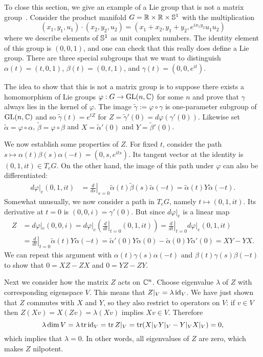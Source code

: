 To close this section, we give an example of a Lie group that is not a matrix group~\cite[Sec~4.8]{Hall2015}.
Consider the product manifold $G = \mathbb{R}\times\mathbb{R}\times\mathbb{S}^1$ with the multiplication
\[
(x_1,y_1,u_1) \cdot (x_2,y_2,u_2) = (x_1+x_2,y_1+y_2,e^{ix_1y_2} u_1u_2)
\]
where we describe elements of $\mathbb{S}^1$ as unit complex numbers.
The identity element of this group is $(0,0,1)$, and one can check that this really does define a Lie group.
There are three special subgroups that we want to distinguish $\alpha(t) = (t,0,1)$, $\beta(t) = (0,t,1)$, and $\gamma(t) = (0,0,e^{it})$.

The idea to show that this is not a matrix group is to suppose there exists a homomorphism of Lie groups $\varphi : G \to \mathrm{GL}(n,\mathbb{C})$ for some $n$ and prove that $\gamma$ always lies in the kernel of $\varphi$.
The image $\tilde{\gamma} := \varphi\circ\gamma$ is one-parameter subgroup of $\mathrm{GL}(n,\mathbb{C})$ and so $\tilde{\gamma}(t) = e^{tZ}$ for $Z = \tilde{\gamma}'(0) = d\varphi(\gamma'(0))$.
Likewise set $\tilde{\alpha} = \varphi \circ \alpha$, $\tilde{\beta} = \varphi \circ \beta$ and $X = \tilde{\alpha}'(0)$ and $Y = \tilde{\beta}'(0)$.

We now establish some properties of $Z$.
For fixed $t$, consider the path $s \mapsto \alpha(t)\beta(s)\alpha(-t) = (0,s,e^{its})$.
Its tangent vector at the identity is $(0,1,it) \in T_eG$.
On the other hand, the image of this path under $\varphi$ can also be differentiated:
\begin{align*}
d\varphi|_e (0,1,it)
&= \left.\frac{d}{ds}\right|_{s=0} \tilde{\alpha}(t)\tilde{\beta}(s)\tilde{\alpha}(-t) 
= \tilde{\alpha}(t) Y \tilde{\alpha}(-t).
\end{align*}
Somewhat unusually, we now consider a path in $T_eG$, namely $t \mapsto (0,1,it)$.
Its derivative at $t=0$ is $(0,0,i) = \gamma'(0)$.
But since $d\varphi|_e$ is a linear map
\begin{align*}
Z 
&= d\varphi|_e (0,0,i)
= d\varphi|_e \left( \left.\frac{d}{dt}\right|_{t=0} (0,1,it) \right)
= \left.\frac{d}{dt}\right|_{t=0} d\varphi|_e(0,1,it) \\
&= \left.\frac{d}{dt}\right|_{t=0} \tilde{\alpha}(t) Y \tilde{\alpha}(-t)
= \tilde{\alpha}'(0) Y \tilde{\alpha}(0) - \tilde{\alpha}(0) Y \tilde{\alpha}'(0)
= X Y - Y X.
\end{align*}
We can repeat this argument with $\alpha(t)\gamma(s)\alpha(-t)$ and $\beta(t)\gamma(s)\beta(-t)$ to show that $0 = X Z - Z X$ and $0 = Y Z - Z Y$.

Next we consider how the matrix $Z$ acts on $\mathbb{C}^n$.
Choose eigenvalue $\lambda$ of $Z$ with corresponding  eigenspace $V$.
This means that $Z|_V = \lambda \operatorname{id}_V$.
We have just shown that $Z$ commutes with $X$ and $Y$, so they also restrict to operators on $V$: if $v \in V$ then $Z(Xv) = X(Zv) = \lambda (Xv)$ implies $Xv \in V$.
Therefore
\[
\lambda \dim V
= \lambda \operatorname{tr} \operatorname{id}_V 
= \operatorname{tr} Z|_V
= \operatorname{tr} (X|_V Y|_V - Y|_V X|_V)
= 0,
\]
which implies that $\lambda = 0$.
In other words, all eigenvalues of $Z$ are zero, which makes $Z$ nilpotent.

